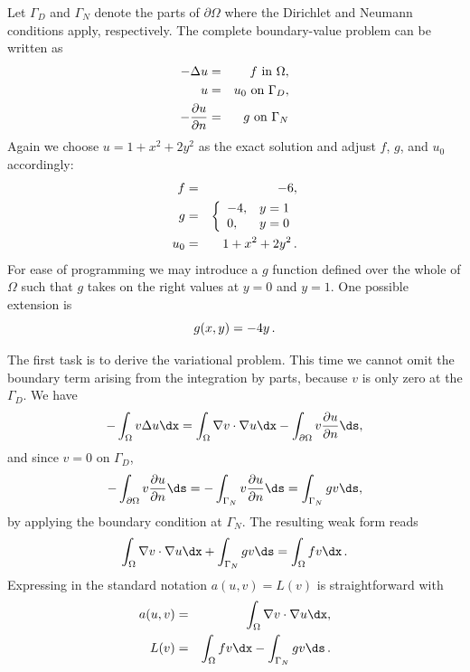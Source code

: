 Let $\Gamma_D$ and $\Gamma_N$
denote the parts of $\partial\Omega$ where the Dirichlet and Neumann
conditions apply, respectively.
The complete boundary-value problem can be written as
\begin{eqnarray}
    - \Delta u &=& f \mbox{ in } \Omega,  \\ %
    u &=& u_0 \mbox{ on } \Gamma_D,       \\ %
    - {\partial u\over\partial n} &=& g \mbox{ on } \Gamma_N  %
\end{eqnarray}
Again we choose $u=1+x^2 + 2y^2$ as the exact solution and adjust $f$, $g$, and
$u_0$ accordingly:
\begin{eqnarray*}
f &=& -6,\\
g &=& \left\lbrace\begin{array}{ll}
-4, & y=1\\
0,  & y=0
\end{array}\right.\\
u_0 &=& 1 + x^2 + 2y^2\thinspace .
\end{eqnarray*}
For ease of programming we may introduce a $g$ function defined over the whole
of $\Omega$ such that $g$ takes on the right values at $y=0$ and
$y=1$. One possible extension is
\[ g(x,y) = -4y\thinspace .\]

The first task is to derive the variational problem. This time we cannot
omit the boundary term arising from the integration by parts, because
$v$ is only zero at the $\Gamma_D$. We have
\[
 -\int_\Omega v\Delta u \dx
= \int_\Omega\nabla v\cdot\nabla u\dx - \int_{\partial\Omega}v{\partial u\over
\partial n}\ds,
\]
and since $v=0$ on $\Gamma_D$,
\[
- \int_{\partial\Omega}v{\partial u\over
\partial n}\ds
=
- \int_{\Gamma_N}v{\partial u\over
\partial n}\ds
= \int_{\Gamma_N}gv\ds,
\]
by applying the boundary condition at $\Gamma_N$.
The resulting weak form reads
\begin{equation}
\int_{\Omega} \nabla v \cdot \nabla u \dx +
\int_{\Gamma_N} g v\ds
= \int_{\Omega} fv \dx\langtangenep
\label{langtangen:poisson:2D:DN:weak}
\end{equation}
Expressing 
in the standard notation $a(u,v)=L(v)$ is straightforward with
\begin{eqnarray}
a(u, v) &=& \int_{\Omega} \nabla v \cdot \nabla u \dx,
\label{langtangen:poisson2:vard:a}\\
L(v) &=& \int_{\Omega} fv \dx -
\int_{\Gamma_N} g v\ds\langtangenep\label{langtangen:poisson2:vard:L}
\end{eqnarray}

